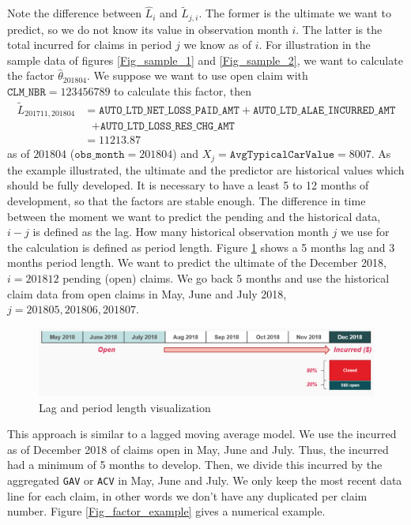 	Note the difference between $\hat{L}_i$ and $\widetilde{L}_{j,i}$. The former is the ultimate we want to predict, so we do not know its value in observation month $i$. The latter is the total incurred for claims in period $j$ we know as of $i$. For illustration in the sample data of figures \ref{Fig_sample_1} and \ref{Fig_sample_2}, we want to calculate the factor $\hat{\theta}_{201804}$. We suppose we want to use open claim with $ \texttt{CLM\_NBR} = 123456789$ to calculate this factor, then 
	\begin{align*}
	\widetilde{L}_{201711, 201804} &= \texttt{AUTO\_LTD\_NET\_LOSS\_PAID\_AMT} + \texttt{AUTO\_LTD\_ALAE\_INCURRED\_AMT} \\
									& \ \ \	+ \texttt{AUTO\_LTD\_LOSS\_RES\_CHG\_AMT} \\
									&= 11213.87
	\end{align*}
	 as of $201804$ ($\texttt{obs\_month} = 201804$) and $X_j = \texttt{AvgTypicalCarValue} = 8007 $.
	As the example illustrated, the ultimate and the predictor are historical values which should be fully developed. It is necessary to have a least 5 to 12 months of development, so that the factors are stable enough. The difference in time between the moment we want to predict the pending and the historical data, $i - j$ is defined as the lag. How many historical observation month $j$ we use for the calculation is defined as period length. Figure \ref{Fig_lag_pl} shows a 5 months lag and 3 months period length. We want to predict the ultimate of the December 2018, $i = 201812$ pending (open) claims. We go back 5 months and use the historical claim data from open claims in May, June and July 2018, $j=201805, 201806, 201807$. 
	\begin{figure}[H]
		\begin{center}
			\includegraphics[scale=0.4]{Graphiques/lag_pl} 
			\renewcommand{\figurename}{Figure}
			\caption{Lag and period length visualization}\label{Fig_lag_pl}
		\end{center}
	\end{figure}
	This approach is similar to a lagged moving average model. We use the incurred as of December 2018 of claims open in May, June and July. Thus, the incurred had a minimum of 5 months to develop. Then, we divide this incurred by the aggregated \texttt{GAV} or \texttt{ACV} in May, June and July. We only keep the most recent data line for each claim, in other words we don’t have any duplicated per claim number. Figure \ref{Fig_factor_example} gives a numerical example. 
